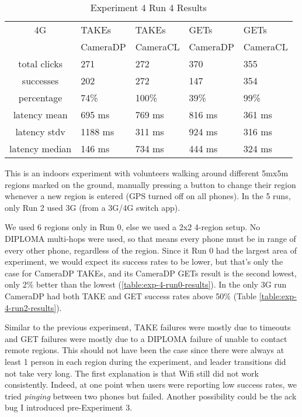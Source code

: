 \begin{table}[htb]
\begin{scriptsize} 
\caption{Experiment 4 Run 4 Results} 
\label{table:exp-4-run4-results}
 \begin{center}
 \begin{tabular}{| c | p{1.5cm} | p{1.5cm} | p{1.5cm} | p{1.4cm} |}
  \hline
  4G & TAKEs & TAKEs & GETs & GETs \\
  & CameraDP & CameraCL & CameraDP & CameraCL \\
  \hline
  total clicks & 271 & 272 & 370 & 355 \\
  \hline
  successes & 202 & 272 & 147 & 354 \\
  \hline
  percentage & 74\% & 100\% & 39\% & 99\% \\
  \hline
  latency mean & 695 ms & 769 ms & 816 ms & 361 ms \\
  \hline
  latency stdv & 1188 ms & 311 ms & 924 ms & 316 ms \\
  \hline
  latency median & 146 ms & 734 ms & 444 ms & 324 ms \\
  \hline
  \end{tabular}
  \end{center}
\end{scriptsize}
\end{table}

This is an indoors experiment with volunteers walking around different 5mx5m regions marked on the ground, manually pressing a button to change their region whenever a new region is entered (GPS turned off on all phones). In the 5 runs, only Run 2 used 3G (from a 3G/4G switch app).

We used 6 regions only in Run 0, else we used a 2x2 4-region setup. No DIPLOMA multi-hops were used, so that means every phone must be in range of every other phone, regardless of the region. Since it Run 0 had the largest area of experiment, we would expect its success rates to be lower, but that's only the case for CameraDP TAKEs, and its CameraDP GETs result is the second lowest, only 2\% better than the lowest (\ref{table:exp-4-run0-results}). In the only 3G run CameraDP had both TAKE and GET success rates above 50\% (Table \ref{table:exp-4-run2-results}).

Similar to the previous experiment, TAKE failures were mostly due to timeouts and GET failures were mostly due to a DIPLOMA failure of unable to contact remote regions. This should not have been the case since there were always at least 1 person in each region during the experiment, and leader transitions did not take very long. The first explanation is that Wifi still did not work consistently. Indeed, at one point when users were reporting low success rates, we tried {\it pinging} between two phones but failed. Another possibility could be the ack bug I introduced pre-Experiment 3.


